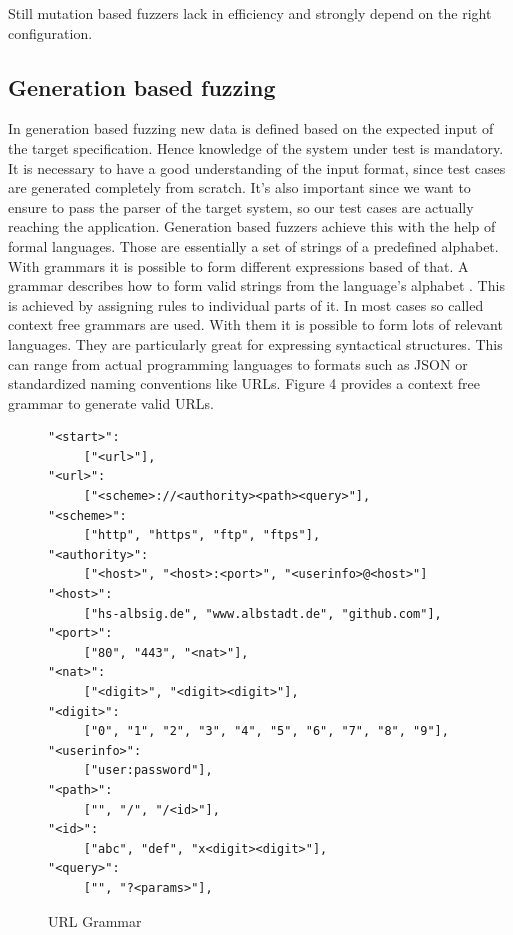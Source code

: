 \documentclass[journal=tosc,final]{iacrtrans}
\begin{document}
Still mutation based fuzzers lack in efficiency and strongly depend on the right configuration. 
\newpage
\subsection{Generation based fuzzing}
In generation based fuzzing new data is defined based on the expected input of the target specification. Hence knowledge of the system under test is mandatory. It is necessary to have a good understanding of the input format, since test cases are generated completely from scratch. It's also important since we want to ensure to pass the parser of the target system, so our test cases are actually reaching the application.
Generation based fuzzers achieve this with the help of formal languages. Those are essentially a set of strings of a predefined alphabet. With grammars it is possible to form different expressions based of that. A grammar describes how to form valid strings from the language's alphabet \cite{fuzz}. This is achieved by assigning rules to individual parts of it.
In most cases so called context free grammars are used. With them it is possible to form lots of relevant languages. They are particularly great for expressing syntactical structures. This can range from actual programming languages to formats such as JSON or standardized naming conventions like URLs. Figure 4 provides a context free grammar to generate valid URLs.
\begin{figure}[h]
 \caption{URL Grammar}
 \begin{center}
\begin{shaded}
\begin{internallinenumbers}
\begin{verbatim}
"<start>":
     ["<url>"],
"<url>":
     ["<scheme>://<authority><path><query>"],
"<scheme>":
     ["http", "https", "ftp", "ftps"],
"<authority>":
     ["<host>", "<host>:<port>", "<userinfo>@<host>"]
"<host>":  
     ["hs-albsig.de", "www.albstadt.de", "github.com"],
"<port>":
     ["80", "443", "<nat>"],
"<nat>":
     ["<digit>", "<digit><digit>"],
"<digit>":
     ["0", "1", "2", "3", "4", "5", "6", "7", "8", "9"],
"<userinfo>":  
     ["user:password"],
"<path>":  
     ["", "/", "/<id>"],
"<id>":  
     ["abc", "def", "x<digit><digit>"],
"<query>":
     ["", "?<params>"],
\end{verbatim}
\end{internallinenumbers}
\end{shaded}
\end{center}

\end{figure}
\end{document}
